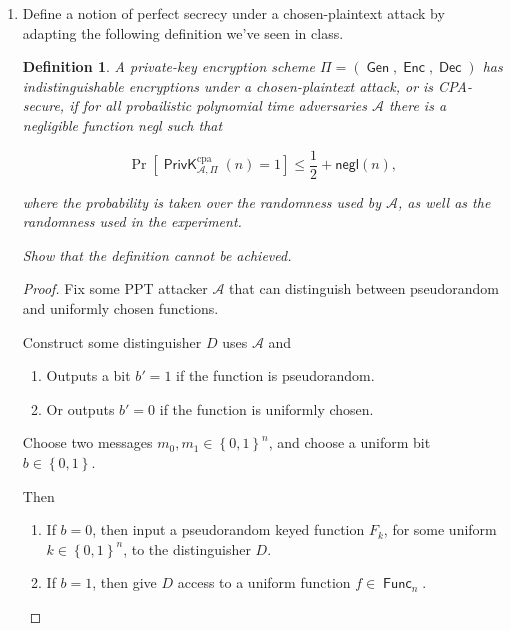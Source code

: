 \documentclass{article}
\newtheorem{definition}{Definition}
\DeclareMathOperator{\Func}{\textsf{Func}}
\DeclareMathOperator{\PrivK}{\textsf{PrivK}}
\DeclareMathOperator{\Gen}{\textsf{Gen}}
\DeclareMathOperator{\Enc}{\textsf{Enc}}
\DeclareMathOperator{\Dec}{\textsf{Dec}}
\begin{document}
\begin{enumerate}
\begin{proof}
      Thus, we find an equivalent definition that $\mathcal{A}$ can only
      distinguish between the two encryption schemes with negligible
      probability.
    \end{proof}
  \item Define a notion of perfect secrecy under a chosen-plaintext attack by
    adapting the following definition we've seen in class.

    \begin{definition}
      \textit{A private-key encryption scheme $\Pi = (\Gen, \Enc,
        \Dec)$ has \textsf{indistinguishable encryptions under a
        chosen-plaintext attack}, or is \textsf{CPA-secure}, if for all
        probailistic polynomial time adversaries $\mathcal{A}$ there is a
      negligible function \textsf{negl} such that}

        \[
          \Pr\left[\PrivK_{\mathcal{A}, \Pi}^\text{cpa}(n) = 1\right] \leq
          \frac{1}{2} + \textsf{negl}(n),
        \]

        \textit{where the probability is taken over the randomness used by
        $\mathcal{A}$, as well as the randomness used in the experiment.}

        \textit{Show that the definition cannot be achieved.}
    \end{definition}

    \begin{proof}
      Fix some PPT attacker $\mathcal{A}$ that can distinguish between
      pseudorandom and uniformly chosen functions.

      Construct some distinguisher $D$ uses $\mathcal{A}$ and
      \begin{enumerate}
        \item Outputs a bit $b' = 1$ if the function is pseudorandom.
        \item Or outputs $b' = 0$ if the function is uniformly chosen.
      \end{enumerate}

      Choose two messages $m_0, m_1 \in \left\{0, 1\right\}^n$, and choose a 
      uniform bit $b \in \left\{0, 1\right\}$.

      Then
      \begin{enumerate}
        \item If $b = 0$, then input a pseudorandom keyed function $F_k$, for
          some uniform $k \in \left\{0, 1\right\}^n$, to the distinguisher $D$.
        \item If $b = 1$, then give $D$ access to a uniform function $f \in
          \Func_n$.
      \end{enumerate}


\end{proof}
\end{enumerate}
\end{document}
